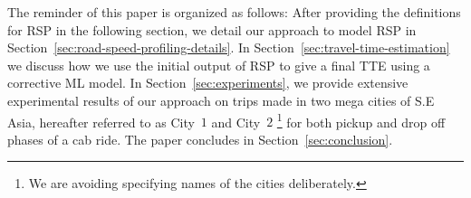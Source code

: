The reminder of this paper is organized as follows: After providing the definitions for \ac{RSP} in the following section, we detail our approach to model \ac{RSP} in Section~\ref{sec:road-speed-profiling-details}.
In Section~\ref{sec:travel-time-estimation} we discuss how we use the initial output of \ac{RSP} to give a final \ac{TTE} using a corrective ML model. 
In Section~\ref{sec:experiments}, we provide extensive experimental results of our approach on trips made in two mega cities of S.E Asia, hereafter referred to as City~$1$ and City~$2$ \footnote{We are avoiding specifying names of the cities deliberately.} for both pickup and drop off phases of a cab ride. The paper concludes in Section~\ref{sec:conclusion}. 


